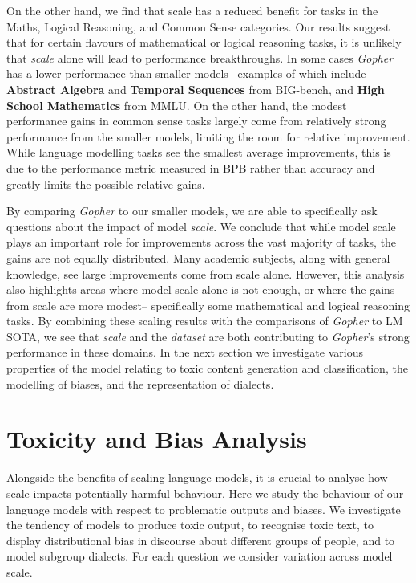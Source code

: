 \documentclass[11pt, a4paper, logo, internal, copyright, nonumbering]{deepmind}
\newcommand{\gopher}{\textit{Gopher}\xspace}
\newcommand{\bigbench}{BIG-bench\xspace}
\begin{document}
On the other hand, we find that scale has a reduced benefit for tasks in the Maths, Logical Reasoning, and Common Sense categories.
Our results suggest that for certain flavours of mathematical or logical reasoning tasks, it is unlikely that \textit{scale} alone will lead to performance breakthroughs. 
In some cases \gopher has a lower performance than smaller models-- examples of which include \textbf{Abstract Algebra} and \textbf{Temporal Sequences} from \bigbench, and \textbf{High School Mathematics} from MMLU.
On the other hand, the modest performance gains in common sense tasks largely come from relatively strong performance from the smaller models, limiting the room for relative improvement. 
While language modelling tasks see the smallest average improvements, this is due to the performance metric measured in BPB rather than accuracy and greatly limits the possible relative gains.

By comparing \gopher to our smaller models, we are able to specifically ask questions about the impact of model \textit{scale}. 
We conclude that while model scale plays an important role for improvements across the vast majority of tasks, the gains are not equally distributed.
Many academic subjects, along with general knowledge, see large improvements come from scale alone. 
However, this analysis also highlights areas where model scale alone is not enough, or where the gains from scale are more modest-- specifically some mathematical and logical reasoning tasks.
By combining these scaling results with the comparisons of \gopher to LM SOTA, we see that \textit{scale} and the \textit{dataset} are both contributing to \gopher's strong performance in these domains.
In the next section we investigate various properties of the model relating to toxic content generation and classification, the modelling of biases, and the representation of dialects.

\section{Toxicity and Bias Analysis}
\label{sec:model_analysis}

Alongside the benefits of scaling language models, it is crucial to analyse how scale impacts potentially harmful behaviour. Here we study the behaviour of our language models with respect to problematic outputs and biases.
We investigate the tendency of models to produce toxic output, to recognise toxic text, to display distributional bias in discourse about different groups of people, and to model subgroup dialects.
For each question we consider variation across model scale.
\end{document}
